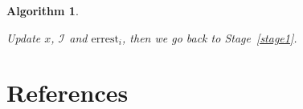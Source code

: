 \documentclass[review]{elsarticle}
\newtheorem{algo}{Algorithm}
\begin{document}
\begin{algo}
\begin{description}
    Update $x$, $\mathcal{I}$ and $\text{errest}_i$, then we go back to Stage~\ref{stage1}.

\end{description}
\end{algo}



\section*{References}


\end{document}
